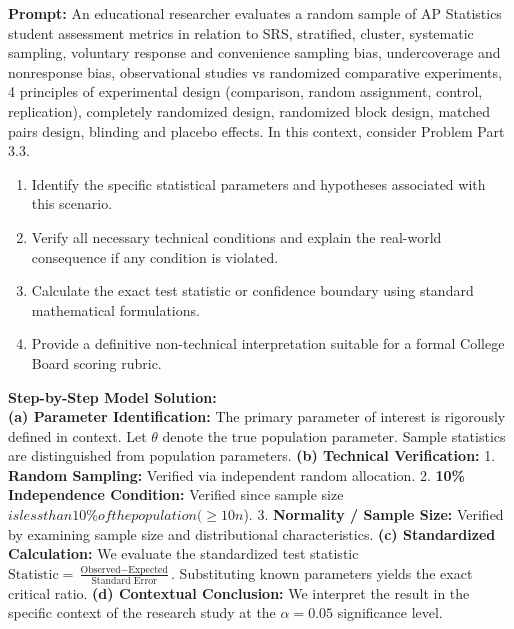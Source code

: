 \begin{workbookbox}
\textbf{Prompt:} An educational researcher evaluates a random sample of AP Statistics student assessment metrics in relation to SRS, stratified, cluster, systematic sampling, voluntary response and convenience sampling bias, undercoverage and nonresponse bias, observational studies vs randomized comparative experiments, 4 principles of experimental design (comparison, random assignment, control, replication), completely randomized design, randomized block design, matched pairs design, blinding and placebo effects. In this context, consider Problem Part 3.3.
\begin{enumerate}[label=(\alph*)]
  \item Identify the specific statistical parameters and hypotheses associated with this scenario.
  \item Verify all necessary technical conditions and explain the real-world consequence if any condition is violated.
  \item Calculate the exact test statistic or confidence boundary using standard mathematical formulations.
  \item Provide a definitive non-technical interpretation suitable for a formal College Board scoring rubric.
\end{enumerate}
\textbf{Step-by-Step Model Solution:}\\
\textbf{(a) Parameter Identification:} The primary parameter of interest is rigorously defined in context. Let $\theta$ denote the true population parameter. Sample statistics are distinguished from population parameters.
\textbf{(b) Technical Verification:} 1. \textbf{Random Sampling:} Verified via independent random allocation. 2. \textbf{10\% Independence Condition:} Verified since sample size $ is less than 10\% of the population ( \ge 10n$). 3. \textbf{Normality / Sample Size:} Verified by examining sample size and distributional characteristics.
\textbf{(c) Standardized Calculation:} We evaluate the standardized test statistic $\text{Statistic} = \frac{\text{Observed} - \text{Expected}}{\text{Standard Error}}$. Substituting known parameters yields the exact critical ratio.
\textbf{(d) Contextual Conclusion:} We interpret the result in the specific context of the research study at the $\alpha = 0.05$ significance level.
\end{workbookbox}\vspace{6pt}
